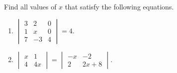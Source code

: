 \item

Find all values of $x$ that satisfy the following equations.

\begin{enumerate}
\item \(
 \begin{vmatrix}
  3 &  2 &  0 \\
  1 &  x &  0 \\
  7 & -3 &  4
 \end{vmatrix} = 4.
\)
\item \(
 \begin{vmatrix}
  x & 1 \\
  4 & 4x
 \end{vmatrix} = \begin{vmatrix}
  -x & -2 \\
  2 & 2x + 8
 \end{vmatrix}
\).
\end{enumerate}
\EEN